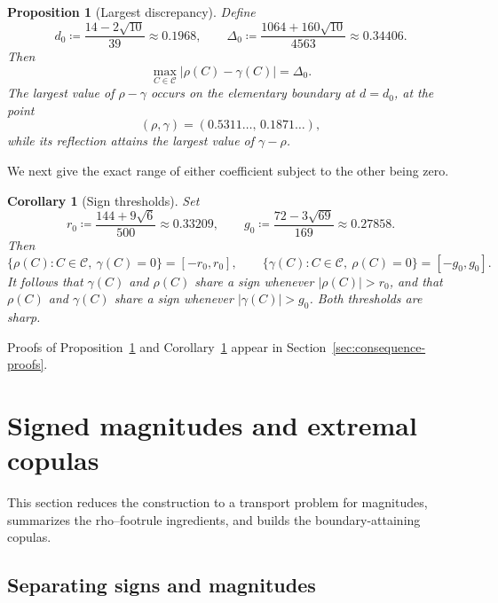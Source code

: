 \documentclass{article}
\newtheorem{proposition}[theorem]{Proposition}
\newtheorem{corollary}[theorem]{Corollary}
\theoremstyle{definition}
\theoremstyle{remark}
\newcommand{\1}{\mathds{1}}
\newcommand{\CC}{\mathcal{C}}
\begin{document}
\begin{proposition}[Largest discrepancy]\label{prop:discrepancy}
Define
\begin{equation}\label{eq:discrepancy-constant}
d_0\coloneqq\frac{14-2\sqrt{10}}{39}\approx0.1968,
\qquad
\Delta_0
\coloneqq
\frac{1064+160\sqrt{10}}{4563}
\approx
0.34406.
\end{equation}
Then
\begin{equation}\label{eq:discrepancy}
\max_{C\in\CC}|\rho(C)-\gamma(C)|=\Delta_0.
\end{equation}
The largest value of $\rho-\gamma$ occurs on the elementary boundary at
$d=d_0$, at the point
\[
(\rho,\gamma)
=
(0.5311\ldots,\,0.1871\ldots),
\]
while its reflection attains the largest value of $\gamma-\rho$.
\end{proposition}

We next give the exact range of either coefficient subject to the other
being zero.

\begin{corollary}[Sign thresholds]\label{cor:signs}
Set
\begin{equation}\label{eq:thresholds}
r_0\coloneqq\frac{144+9\sqrt6}{500}\approx0.33209,
\qquad
g_0\coloneqq\frac{72-3\sqrt{69}}{169}\approx0.27858.
\end{equation}
Then
\begin{equation}\label{eq:zero-sections}
\{\rho(C):C\in\CC,\ \gamma(C)=0\}=[-r_0,r_0],
\qquad
\{\gamma(C):C\in\CC,\ \rho(C)=0\}=[-g_0,g_0].
\end{equation}
It follows that $\gamma(C)$ and $\rho(C)$ share a sign whenever
$|\rho(C)|>r_0$, and that $\rho(C)$ and $\gamma(C)$ share a sign whenever
$|\gamma(C)|>g_0$. Both thresholds are sharp.
\end{corollary}

Proofs of Proposition~\ref{prop:discrepancy} and
Corollary~\ref{cor:signs} appear in
Section~\ref{sec:consequence-proofs}.
\section{Signed magnitudes and extremal copulas}\label{sec:construction}

This section reduces the construction to a transport problem for magnitudes,
summarizes the rho--footrule ingredients, and builds the boundary-attaining copulas.

\subsection{Separating signs and magnitudes}\label{sec:signs}
\end{document}
